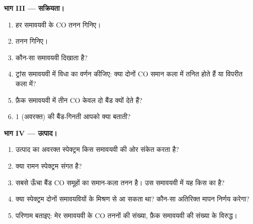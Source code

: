 \begin{problem}
\medskip\noindent\textbf{भाग III --- सक्रियता।}
\begin{enumerate}[resume]
  \item हर समावयवी के  CO तनन गिनिए।
  \item {} तनन गिनिए।
  \item कौन-सा समावयवी  दिखाता है?
  \item ट्रांस समावयवी में  विधा का वर्णन कीजिए: क्या दोनों CO
        समान कला में तनित होते हैं या विपरीत कला में?
  \item फ़ैक समावयवी में तीन CO केवल दो बैंड क्यों देते हैं?
  \item 1 (अवरक्त) की बैंड-गिनती आपको क्या बताती?
\end{enumerate}

\medskip\noindent\textbf{भाग IV --- उत्पाद।}
\begin{enumerate}[resume]
  \item उत्पाद का अवरक्त स्पेक्ट्रम किस समावयवी की ओर संकेत करता है?
  \item क्या रामन स्पेक्ट्रम संगत है?
  \item सबसे ऊँचा बैंड CO समूहों का समान-कला तनन है। उस समावयवी में यह
        किस  का है?
  \item क्या स्पेक्ट्रम दोनों समावयवियों के मिश्रण से आ सकता था? कौन-सा
        अतिरिक्त मापन निर्णय करेगा?
  \item परिणाम बताइए: मेर समावयवी के  CO तननों की संख्या, फ़ैक
        समावयवी की संख्या के विरुद्ध।
\end{enumerate}
\end{problem}
